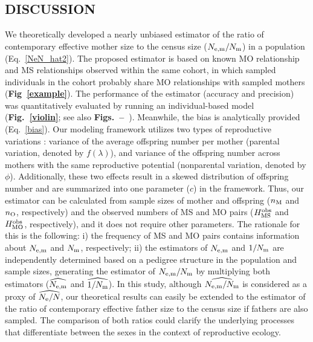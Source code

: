 \documentclass[12pt, English]{article}
\begin{document}
\begin{spacing}{1.9}
\section{DISCUSSION}

We theoretically developed a nearly unbiased estimator of the ratio of contemporary effective mother size to the census size ($N_{\rm e,m}/N_{\rm m}$) in a population (Eq.~\ref{NeN_hat2}). The proposed estimator is based on known MO relationship and MS relationships observed within the same cohort, in which sampled individuals in the cohort probably share MO relationships with sampled mothers ({\bf Fig~\ref{example}}). The performance of the estimator (accuracy and precision) was quantitatively evaluated by running an individual-based model ({\bf Fig.~\ref{violin}}; see also {\bf Figs.~\NeNbias{}--~\Ninvcv{}}). Meanwhile, the bias is analytically provided (Eq.~\ref{bias}). Our modeling framework utilizes two types of reproductive variations \cite[]{Akita_2019}: variance of the average offspring number per mother (parental variation, denoted by $f(\lambda)$), and variance of the offspring number across mothers with the same reproductive potential (nonparental variation, denoted by $\phi$). Additionally, these two effects result in a skewed distribution of offspring number and are summarized into one parameter ($c$) in the framework. Thus, our estimator can be calculated from sample sizes of mother and offspring ($n_{\rm M}$ and $n_{\rm O}$, respectively) and the observed numbers of MS and MO pairs ($H_{\rm MS}^{\rm obs}$ and $H_{\rm MO}^{\rm obs}$, respectively), and it does not require other parameters. The rationale for this is the following: i) the frequency of MS and MO pairs contains information about $N_{\rm e,m}$ and $N_{\rm m}$, respectively; ii) the estimators of $N_{\rm e,m}$ and $1/N_{\rm m}$ are independently determined based on a pedigree structure in the population and sample sizes, generating the estimator of $N_{\rm e,m}/N_{\rm m}$ by multiplying both estimators ($\widehat{N_{\rm e,m}}$ and $\widehat{1/N_{\rm m}}$). In this study, although $\widehat{N_{\rm e,m}/N_{\rm m}}$ is considered as a proxy of $\widehat{N_{\rm e}/N}$, our theoretical results can easily be extended to the estimator of the ratio of contemporary effective father size to the census size if fathers are also sampled. The comparison of both ratios could clarify the underlying processes that differentiate between the sexes in the context of reproductive ecology.  


\end{spacing}
\end{document}
